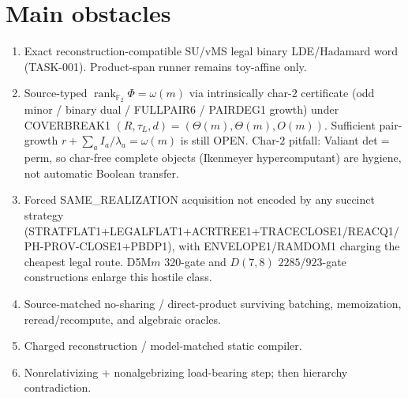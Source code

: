 \documentclass[11pt]{article}
\begin{document}
\section*{Main obstacles}
\begin{enumerate}
\item Exact reconstruction-compatible SU/vMS legal binary LDE/Hadamard word
(TASK-001). Product-span runner remains toy-affine only.
\item Source-typed $\operatorname{rank}_{\mathbb F_2}\Phi=\omega(m)$ via
intrinsically char-$2$ certificate (odd minor / binary dual / FULLPAIR6 /
PAIRDEG1 growth) under COVERBREAK1
$(R,\tau_L,d)=(\Theta(m),\Theta(m),O(m))$. Sufficient pair-growth
$r+\sum_a I_a/\lambda_a=\omega(m)$ is still OPEN. Char-$2$ pitfall: Valiant
det$=$perm, so char-free complete objects (Ikenmeyer hypercomputant) are
hygiene, not automatic Boolean transfer.
\item Forced SAME\_REALIZATION acquisition not encoded by any succinct strategy
(STRATFLAT1+LEGALFLAT1+ACRTREE1+TRACECLOSE1/REACQ1/PH-PROV-CLOSE1+PBDP1), with
ENVELOPE1/RAMDOM1 charging the cheapest legal route. D5M$m$ $320$-gate and
$D(7,8)$ $2285$/$923$-gate constructions enlarge this hostile class.
\item Source-matched no-sharing / direct-product surviving batching, memoization,
reread/recompute, and algebraic oracles.
\item Charged reconstruction / model-matched static compiler.
\item Nonrelativizing + nonalgebrizing load-bearing step; then hierarchy
contradiction.
\end{enumerate}
\end{document}
